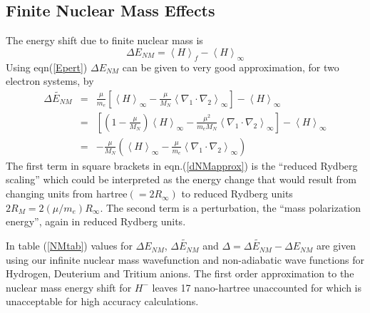 \documentclass[12pt,thmsa]{article}
\begin{document}
\subsection{Finite Nuclear Mass Effects\label{nucmotian}\label{NMeffect}}

The energy shift due to finite nuclear mass is 
\begin{equation}
\Delta E_{NM}=\left\langle H\right\rangle _f-\left\langle H\right\rangle
_\infty  \label{dENM}
\end{equation}
Using eqn(\ref{Epert}) $\Delta E_{NM}$ can be given to very good
approximation, for two electron systems, by 
\begin{eqnarray}
\widetilde{\Delta E_{NM}} &=&\frac \mu {m_e}\left[ \left\langle
H\right\rangle _\infty -\frac \mu {M_N}\left\langle \nabla _1\cdot \nabla
_2\right\rangle _\infty \right] -\left\langle H\right\rangle _\infty 
\nonumber \\
&=&\left[ \left( 1-\frac \mu {M_N}\right) \left\langle H\right\rangle
_\infty -\frac{\mu ^2}{m_eM_N}\left\langle \nabla _1\cdot \nabla
_2\right\rangle _\infty \right] -\left\langle H\right\rangle _\infty 
\nonumber \\
&=&-\frac \mu {M_N}\left( \left\langle H\right\rangle _\infty -\frac \mu
{m_e}\left\langle \nabla _1\cdot \nabla _2\right\rangle _\infty \right)
\label{dNMapprox}
\end{eqnarray}
The first term in square brackets in eqn.(\ref{dNMapprox}) is the ``reduced
Rydberg scaling'' which could be interpreted as the energy change that would
result from changing units from hartree$(=2R_\infty )$ to reduced Rydberg
units $2R_M=2(\mu /m_e)R_\infty $. The second term is a perturbation, the
``mass polarization energy'', again in reduced Rydberg units.

In table (\ref{NMtab}) values for $\Delta E_{NM}$, $\widetilde{\Delta E_{NM}}
$ and $\Delta =\widetilde{\Delta E_{NM}}-\Delta E_{NM}$ are given using our
infinite nuclear mass wavefunction and non-adiabatic wave functions for
Hydrogen, Deuterium and Tritium anions. The first order approximation to the
nuclear mass energy shift for $H^{-}$ leaves 17 nano-hartree unaccounted for
which is unacceptable for high accuracy calculations.
\end{document}
